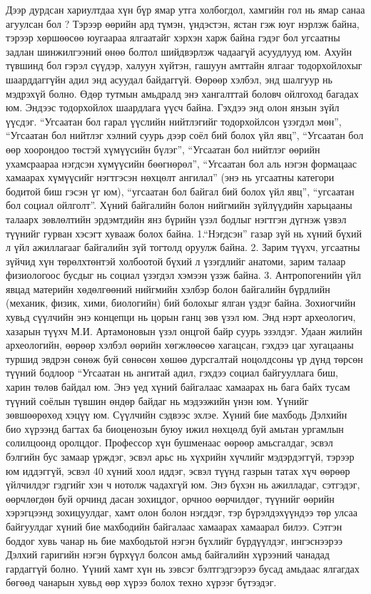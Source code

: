 Дээр дурдсан хариултдаа хүн бүр ямар утга холбогдол, хамгийн гол нь ямар санаа агуулсан бол ? Тэрээр өөрийн ард түмэн, үндэстэн, ястан гэж юуг нэрлэж байна, тэрээр хөршөөсөө юугаараа ялгаатайг хэрхэн харж байна гэдэг бол угсаатны задлан шинжилгээний өнөө болтол шийдвэрлэж чадаагүй асуудлууд юм. Ахуйн түвшинд бол гэрэл сүүдэр, халуун хүйтэн, гашуун амттайн ялгааг тодорхойлохыг шаарддаггүйн адил энд асуудал байдаггүй. Өөрөөр хэлбэл, энд шалгуур нь мэдрэхүй болно. Өдөр тутмын амьдралд энэ хангалттай боловч ойлгоход багадах юм. Эндээс тодорхойлох шаардлага үүсч байна. Гэхдээ энд олон янзын зүйл үүсдэг. “Угсаатан бол гарал үүслийн нийтлэгийг тодорхойлсон үзэгдэл мөн”, “Угсаатан бол нийтлэг хэлний суурь дээр соёл бий болох үйл явц”, “Угсаатан бол өөр хоорондоо төстэй хүмүүсийн бүлэг”, “Угсаатан бол нийтлэг өөрийн ухамсраараа нэгдсэн хүмүүсийн бөөгнөрөл”, “Угсаатан бол аль нэгэн формацаас хамаарах хүмүүсийг нэгтгэсэн нөхцөлт ангилал” (энэ нь угсаатны категори бодитой биш гэсэн үг юм), “угсаатан бол байгал бий болох үйл явц”, “угсаатан бол социал ойлголт”.
Хүний байгалийн болон нийгмийн зүйлүүдийн харьцааны талаарх зөвлөлтийн эрдэмтдийн янз бүрийн үзэл бодлыг нэгтгэн дүгнэж үзвэл түүнийг гурван хэсэгт хувааж болох байна. 1.“Нэгдсэн” газар зүй нь хүний бүхий л үйл ажиллагааг байгалийн зүй тогтолд оруулж байна. 2. Зарим түүхч, угсаатны зүйчид хүн төрөлхтөнтэй холбоотой бүхий л үзэгдлийг анатоми, зарим талаар физиологоос бусдыг нь социал үзэгдэл хэмээн үзэж байна. 3. Антропогенийн үйл явцад материйн хөдөлгөөний нийгмийн хэлбэр болон байгалийн бүрдлийн (механик, физик, хими, биологийн) бий болохыг ялган үздэг байна. Зохиогчийн хувьд сүүлчийн энэ концепци нь цорын ганц зөв үзэл юм.
Энд нэрт археологич, хазарын түүхч М.И. Артамоновын үзэл онцгой байр суурь эзэлдэг. Удаан жилийн археологийн, өөрөөр хэлбэл өөрийн хөгжлөөсөө хагацсан, гэхдээ цаг хугацааны туршид эвдрэн сөнөж буй сөнөсөн хөшөө дурсгалтай ноцолдсоны үр дүнд төрсөн түүний бодлоор “Угсаатан нь ангитай адил, гэхдээ социал байгууллага биш, харин төлөв байдал юм. Энэ үед хүний байгалаас хамаарах нь бага байх тусам түүний соёлын түвшин өндөр байдаг нь мэдээжийн үнэн юм. Үүнийг зөвшөөрөхөд хэцүү юм.
Сүүлчийн сэдвээс эхлэе. Хүний бие махбодь Дэлхийн био хүрээнд багтах ба биоценозын буюу ижил нөхцөлд буй амьтан ургамлын солилцоонд оролцдог. Профессор хүн бушменаас өөрөөр амьсгалдаг, эсвэл бэлгийн бус замаар үрждэг, эсвэл арьс нь хүхрийн хүчлийг мэдэрдэггүй, тэрээр юм иддэггүй, эсвэл 40 хүний хоол иддэг, эсвэл түүнд газрын татах хүч өөрөөр үйлчилдэг гэдгийг хэн ч нотолж чадахгүй юм.
Энэ бүхэн нь ажилладаг, сэтгэдэг, өөрчлөгдөн буй орчинд дасан зохицдог, орчноо өөрчилдөг, түүнийг өөрийн хэрэгцээнд зохицуулдаг, хамт олон болон нэгддэг, тэр бүрэлдэхүүндээ төр улсаа байгуулдаг хүний бие махбодийн байгалаас хамаарах хамаарал билээ. Сэтгэн боддог хувь чанар нь бие махбодьтой нэгэн бүхлийг бүрдүүлдэг, ингэснээрээ Дэлхий гаригийн нэгэн бүрхүүл болсон амьд байгалийн хүрээний чанадад гардаггүй болно. Үүний хамт хүн нь зэвсэг бэлтгэдгээрээ бусад амьдаас ялгагдах бөгөөд чанарын хувьд өөр хүрээ болох техно хүрээг бүтээдэг.
